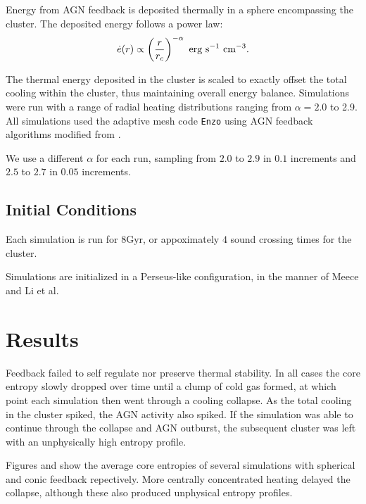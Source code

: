 \documentclass[iop,apjl, twocolappendix]{emulateapj}   %
\begin{document}
Energy from AGN feedback is deposited thermally in a sphere encompassing the
cluster. The deposited energy follows a power law:
\vspace{-0.5em}
\begin{equation}
	\dot{e}(r) \propto \left( \frac{r}{r_c} \right )^{-\alpha} \text{ erg} \text{ s}^{-1} \text{ cm}^{-3}.
	\vspace{-0.5em}
\end{equation}

\noindent
The thermal energy deposited in the cluster is scaled to exactly offset the
total cooling within the cluster, thus maintaining overall energy balance.
Simulations were run with a range of radial heating distributions ranging from
$\alpha = 2.0$ to 2.9. 
All simulations used the adaptive mesh code \texttt{Enzo}
\cite{bryan_enzo_2014-1} using AGN feedback algorithms modified from
\cite{meece_jr_agn_2016,meece_triggering_2017}.


We use a different $\alpha$ for each run, sampling from $2.0$ to
$2.9$ in $0.1$ increments and $2.5$ to $2.7$ in $0.05$ increments.

\subsection{Initial Conditions}
\label{sec:initial_conditions}
\textbullet Each simulation is run for $8 \text{Gyr}$, or appoximately $4$ sound crossing
times for the cluster. 

Simulations are initialized in a Perseus-like configuration, in the manner
of Meece \cite{meece_triggering_2017} and Li et al.\ \cite{li_cooling_2015} 

\section{Results}

\textbullet Feedback failed to self regulate nor preserve thermal stability. In
all cases the core entropy slowly dropped over time until a clump of cold gas
formed, at which point each simulation then went through a cooling collapse. As
the total cooling in the cluster spiked, the AGN activity also spiked. If the
simulation was able to continue through the collapse and AGN outburst, the
subsequent cluster was left with an unphysically high entropy profile.  

Figures \label{fig:sphericalCoreEntropies} and \label{fig:conicCoreEntropies}
show the average core entropies of several simulations with spherical and conic
feedback repectively. More centrally concentrated heating delayed the collapse,
although these also produced unphysical entropy profiles.
\end{document}
